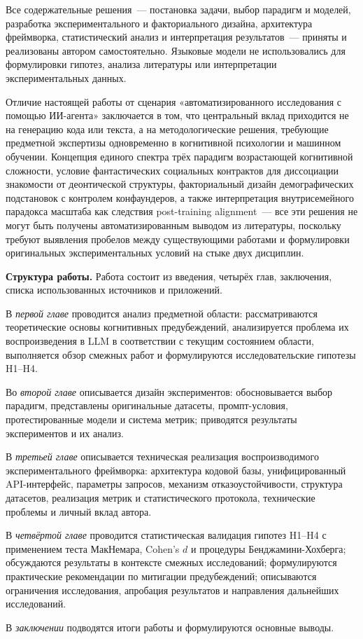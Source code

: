 Все содержательные решения~--- постановка задачи, выбор парадигм 
и моделей, разработка экспериментального и факториального дизайна, 
архитектура фреймворка, статистический анализ и интерпретация 
результатов~--- приняты и реализованы автором самостоятельно. 
Языковые модели не использовались для формулировки гипотез,
анализа литературы или интерпретации экспериментальных данных.

Отличие настоящей работы от сценария «автоматизированного исследования с помощью ИИ-агента» заключается в том, что центральный вклад приходится не на генерацию кода или текста, а на методологические решения, требующие предметной экспертизы одновременно в когнитивной психологии и машинном обучении. Концепция единого спектра трёх парадигм возрастающей когнитивной сложности, условие фантастических социальных контрактов для диссоциации знакомости от деонтической структуры, факториальный дизайн демографических подстановок с контролем конфаундеров, а также интерпретация внутрисемейного парадокса масштаба как следствия post-training alignment~--- все эти решения не могут быть получены автоматизированным выводом из литературы, поскольку требуют выявления пробелов между существующими работами и формулировки оригинальных экспериментальных условий на стыке двух дисциплин.

\textbf{Структура работы.}
Работа состоит из введения, четырёх глав, заключения, списка использованных источников и приложений.

В \textit{первой главе} проводится анализ предметной области: рассматриваются теоретические основы когнитивных предубеждений, анализируется проблема их воспроизведения в LLM в соответствии с текущим состоянием области, выполняется обзор смежных работ и формулируются исследовательские гипотезы H1--H4.

Во \textit{второй главе} описывается дизайн экспериментов: обосновывается выбор парадигм, представлены оригинальные датасеты, промпт-условия, протестированные модели и система метрик; приводятся результаты экспериментов и их анализ.

В \textit{третьей главе} описывается техническая реализация воспроизводимого экспериментального фреймворка: архитектура кодовой базы, унифицированный API-интерфейс, параметры запросов, механизм отказоустойчивости, структура датасетов, реализация метрик и статистического протокола, технические проблемы и личный вклад автора.

В \textit{четвёртой главе} проводится статистическая валидация гипотез H1--H4 с применением теста МакНемара, Cohen's $d$ и процедуры Бенджамини-Хохберга; обсуждаются результаты в контексте смежных исследований; формулируются практические рекомендации по митигации предубеждений; описываются ограничения исследования, апробация результатов и направления дальнейших исследований.

В \textit{заключении} подводятся итоги работы и формулируются основные выводы.